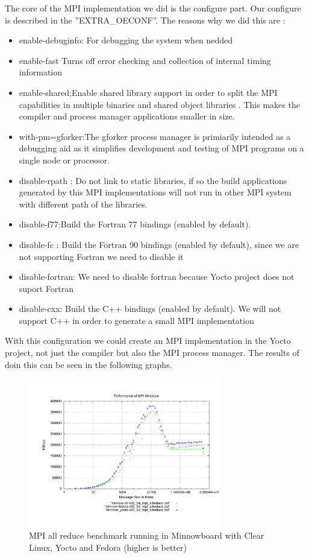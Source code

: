 The core of the MPI implementation we did is the configure part. Our configure
is described in the ''EXTRA\_OECONF''. The reasons why we did this are : 

\begin{itemize}
\item enable-debuginfo: For debugging the system when nedded
\item enable-fast Turns off error checking and collection of internal timing
information
\item enable-shared;Enable shared library support in order to split the MPI
capabilities in multiple binaries and shared object libraries . This makes the
compiler and process manager applications smaller in size.
\item with-pm=gforker:The gforker process manager is primiarily intended as a
debugging aid as it simplifies development and testing of MPI programs on a
single node or processor.
\item disable-rpath : Do not link to static libraries, if so the build
applications generated by this MPI implementations will not run in other MPI
system with different path of the libraries.
\item disable-f77:Build the Fortran 77 bindings (enabled by default).
\item disable-fc : Build the Fortran 90 bindings (enabled by default), since we
are not supporting Fortran we need to disable it 
\item disable-fortran: We need to disable fortran because Yocto project does
not suport Fortran
\item disable-cxx: Build the C++ bindings (enabled by default). We will not
support C++ in order to generate a small MPI implementation
\end{itemize}

With this configuration we could create an MPI implementation in the Yocto
project, not just the compiler but also the MPI process manager. The results of
doin this can be seen in the following graphs.


\begin{figure}[H]
\centering
\includegraphics[width=0.75\textwidth]{images/mpbench_yocto_experiments/mpi_allreduce.pdf}
\caption{MPI all reduce benchmark running in Minnowboard with Clear Linux,
Yocto and Fedora (higher is better)}
\label{fig:5.7}
\end{figure}



